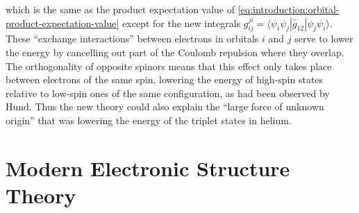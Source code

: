 which is the same as the product expectation value of
\cref{eq:introduction:orbital-product-expectation-value} except for the new
integrals
\(
    g_{ij}^{ji}
    =
    \langle \psi_i\psi_j|\hat{g}_{12}|\psi_j\psi_i\rangle
\).
These ``exchange interactions'' between electrons in orbitals \(i\) and \(j\)
serve to lower the energy by cancelling out part of the Coulomb repulsion where
they overlap.
The orthogonality of opposite spinors means that this effect only takes place
between electrons of the same spin, lowering the energy of high-spin states
relative to low-spin ones of the same configuration, as had been observed by
Hund.\cite{Hund:1925p345}
Thus the new theory could also explain the ``large force of unknown
origin''\cite{Mehra:1982} that was lowering the energy of the triplet states in
helium.


\section{Modern Electronic Structure Theory}

